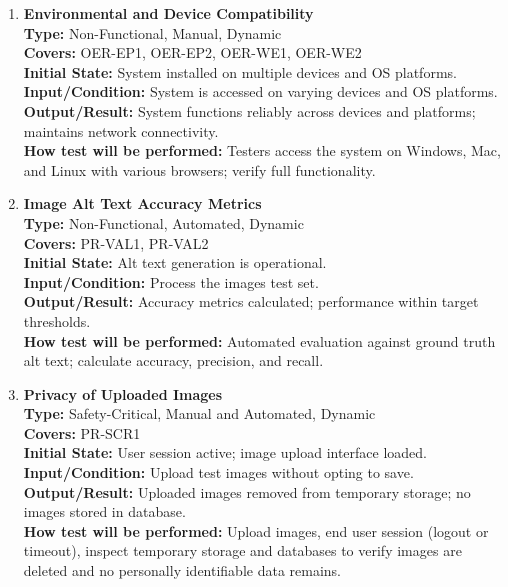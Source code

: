 \documentclass[12pt, titlepage]{article}
\begin{document}
\begin{enumerate}[label=NFR-ST \arabic*., wide=0pt, leftmargin=*]
  \item \textbf{Environmental and Device Compatibility} \\[2mm]
    \textbf{Type:} Non-Functional, Manual, Dynamic \\
    \textbf{Covers:} OER-EP1, OER-EP2, OER-WE1, OER-WE2 \\
    \textbf{Initial State:} System installed on multiple devices and
    OS platforms. \\
    \textbf{Input/Condition:} System is accessed on varying devices and OS platforms. \\
    \textbf{Output/Result:} System functions reliably across devices and
    platforms; maintains network connectivity. \\[2mm]
    \textbf{How test will be performed:} Testers access the system on
    Windows, Mac, and Linux with various browsers; verify full functionality.

  \item \textbf{Image Alt Text Accuracy Metrics} \\[2mm]
    \textbf{Type:} Non-Functional, Automated, Dynamic \\
    \textbf{Covers:} PR-VAL1, PR-VAL2 \\
    \textbf{Initial State:} Alt text generation is operational. \\
    \textbf{Input/Condition:} Process the images test set. \\
    \textbf{Output/Result:} Accuracy metrics calculated; performance
    within target thresholds. \\[2mm]
    \textbf{How test will be performed:} Automated evaluation against
    ground truth alt text; calculate accuracy, precision, and recall.

  \item \textbf{Privacy of Uploaded Images} \\[2mm]
    \textbf{Type:} Safety-Critical, Manual and Automated, Dynamic \\
    \textbf{Covers:} PR-SCR1 \\
    \textbf{Initial State:} User session active; image upload
    interface loaded. \\
    \textbf{Input/Condition:} Upload test images without opting to save. \\
    \textbf{Output/Result:} Uploaded images removed from temporary
    storage; no images stored in database. \\[2mm]
    \textbf{How test will be performed:}
    Upload images, end user session (logout or timeout), inspect
    temporary storage and databases to verify images are deleted and
    no personally identifiable data remains.


\end{enumerate}
\end{document}
